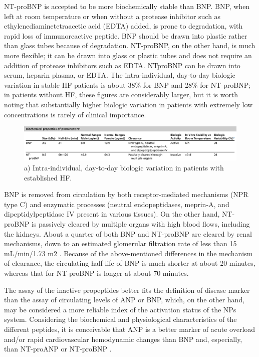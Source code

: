\documentclass[14pt,a4paper,onecolumn]{extarticle}
\begin{document}
NT-proBNP is accepted to be more biochemically stable than BNP. BNP, when left at room temperature or when without a protease inhibitor such as ethylenediaminetetraacetic acid (EDTA) added, is prone to degradation, with rapid loss of immunoreactive peptide. BNP should be drawn into plastic rather than glass tubes because of degradation. NT-proBNP, on the other hand, is much more flexible; it can be drawn into glass or plastic tubes and does not require an addition of protease inhibitors such as EDTA. NTproBNP can be drawn into serum, heparin plasma, or EDTA. The intra-individual, day-to-day biologic variation in stable HF patients is about 38\% for BNP and 28\% for NT-proBNP; in patients without HF, these figures are considerably larger, but it is worth noting that substantially higher biologic variation in patients with extremely low concentrations is rarely of clinical importance. \citep{Gaggin2014} %

\begin{figure}   \includegraphics{../../images/NP_biochem.png}   \caption{a) Intra-individual, day-to-day biologic variation in patients with established HF. \citep{Gaggin2014}}   \label{NP_biochem} \end{figure} %

BNP is removed from circulation by both receptor-mediated mechanisms (NPR type C) and enzymatic processes (neutral endopeptidases, meprin-A, and dipeptidylpeptidase IV present in various tissues). On the other hand, NT-proBNP is passively cleared by multiple organs with high blood flows, including the kidneys. About a quarter of both BNP and NT-proBNP are cleared by renal mechanisms, down to an estimated glomerular filtration rate of less than 15 mL/min/1.73 m2 . Because of the above-mentioned differences in the mechanism of clearance, the circulating half-life of BNP is much shorter at about 20 minutes, whereas that for NT-proBNP is longer at about 70 minutes. \citep{Gaggin2014} %

The assay of the inactive propeptides better fits the definition of disease marker than the assay of circulating levels of ANP or BNP, which, on the other hand, may be considered a more reliable index of the activation status of the NPs system. Considering the biochemical and physiological characteristics of the different peptides, it is conceivable that ANP is a better marker of acute overload and/or rapid cardiovascular hemodynamic changes than BNP and, especially, than NT-proANP or NT-proBNP \citep{bib32} \citep{bib35}. %
\end{document}

